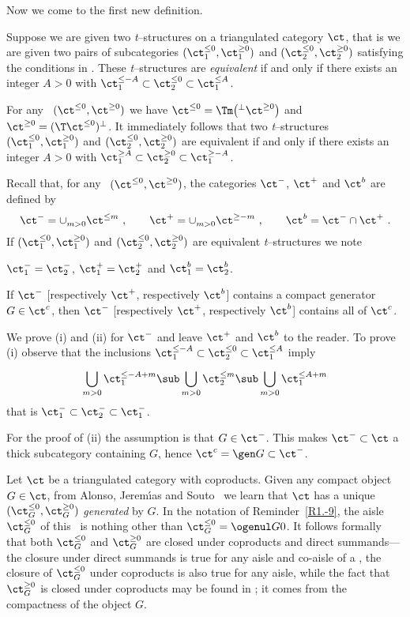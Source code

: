 \documentclass[11pt]{amsart}
\begin{document}
Now we come to the first new definition.

Suppose we are given two {\it t}--structures on a triangulated
category $\ct$, that is we are given two pairs of
subcategories $(\ct_1^{\leq0},\ct_1^{\geq0})$ and
$(\ct_2^{\leq0},\ct_2^{\geq0})$ satisfying the conditions in
\cite[D\'efinition~1.3.1]{BeiBerDel82}.
These {\it t}--structures are \emph{equivalent}
if and only if there exists an integer $A>0$ with
$\ct_1^{\leq-A}\subset\ct_2^{\leq0}\subset\ct_1^{\leq A}$.
\edfn

For any \tstr\ $(\ct^{\leq0},\ct^{\geq0})$ we
have $\ct^{\leq0}=\Tm\big({^\perp\ct^{\geq0}}\big)$ and
$\ct^{\geq0}=(\T\ct^{\leq0})^\perp$. It immediately
follows that two {\it t}--structures
$(\ct_1^{\leq0},\ct_1^{\geq0})$ and
$(\ct_2^{\leq0},\ct_2^{\geq0})$
are equivalent if and only if there exists an integer $A>0$ with
$\ct_1^{\geq A}\subset\ct_2^{\geq0}\subset\ct_1^{\geq-A}$.
\eobs

Recall that, for any \tstr\ $(\ct^{\leq0},\ct^{\geq0})$, the categories
$\ct^-$, $\ct^+$ and $\ct^b$ are defined by
\[
\ct^-=\cup_{m>0}^{}\ct^{\leq m}\ ,\qquad
\ct^+=\cup_{m>0}^{}\ct^{\geq -m}\ ,\qquad
\ct^b=\ct^-\cap\ct^+\ .
\]
If
$(\ct_1^{\leq0},\ct_1^{\geq0})$ and
$(\ct_2^{\leq0},\ct_2^{\geq0})$
are equivalent {\it t}--structures we note
\be
\item
  $\ct_1^-=\ct_2^-$, $\ct^+_1=\ct^+_2$ and $\ct^b_1=\ct^b_2$.
\item
  If $\ct^-$ [respectively $\ct^+$, respectively $\ct^b$] contains a
  compact generator $G\in\ct^c$, then
  $\ct^-$ [respectively $\ct^+$, respectively $\ct^b$] contains all
  of
  $\ct^c$.
\ee
\eobs

\prf
We prove (i) and (ii) for $\ct^-$ and leave $\ct^+$ and $\ct^b$
to the reader. To prove (i) observe that the inclusions
$\ct_1^{\leq-A}\subset\ct_2^{\leq0}\subset\ct_1^{\leq A}$ imply
\[
\bigcup_{m>0}^{}\ct_1^{\leq-A+m}\sub\bigcup_{m>0}^{}\ct_2^{\leq m}\sub
\bigcup_{m>0}^{}\ct_1^{\leq A+m}
\]
that is $\ct_1^-\subset\ct_2^-\subset\ct_1^-$.

For the proof of (ii) the assumption is
that $G\in\ct^-$.
This makes $\ct^-\subset\ct$ a thick subcategory containing
$G$, hence $\ct^c=\gen G{}\subset\ct^-$.
\eprf


Let $\ct$ be a triangulated category with coproducts. Given any
compact object $G\in\ct$, from Alonso, Jerem{\'{\i}}as and
Souto~\cite[Theorem~A.1]{Alonso-Jeremias-Souto03} we
learn that $\ct$ has a unique \tstr\ $(\ct_G^{\leq0},\ct_G^{\geq0})$
\emph{generated} by $G$.
In the notation of Reminder~\ref{R1.-9}, the aisle $\ct_G^{\leq0}$
of this \tstr\ is
nothing other than $\ct_G^{\leq0}=\ogenul G{}0$.
It follows formally that both $\ct_G^{\leq0}$ and $\ct_G^{\geq0}$ are closed
under coproducts and direct summands---the closure under direct
summands is true for any aisle and co-aisle of a \tstr, the closure
of $\ct_G^{\leq0}$ under coproducts is also true for any aisle,
while
the fact that $\ct_G^{\geq0}$ is closed under coproducts may be found in
\cite[Proposition~A.2]{Alonso-Jeremias-Souto03}; it comes from the
compactness of the object $G$.
\end{document}
